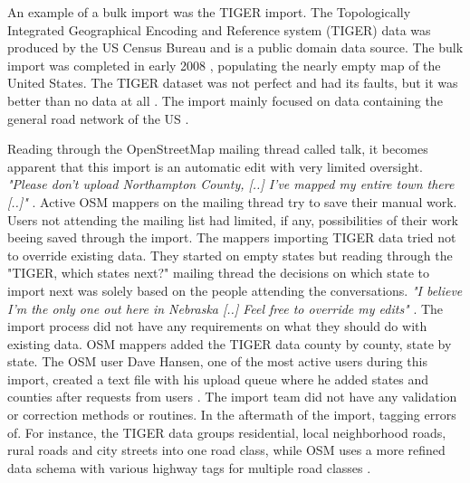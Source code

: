 An example of a bulk import was the TIGER import. The Topologically Integrated Geographical Encoding and Reference system (TIGER) data was produced by the US Census Bureau and is a public domain data source. The bulk import was completed in early 2008 \cite{Zielstra2013}, populating the nearly empty map of the United States. The TIGER dataset was not perfect and had its faults, but it was better than no data at all \cite{Willis2008}. The import mainly focused on data containing the general road network of the US \cite{Zielstra2013}. 

Reading through the OpenStreetMap mailing thread called talk, it becomes apparent that this import is an automatic edit with very limited oversight. \textit{"Please don't upload Northampton County, [..] I've mapped my entire town there [..]"} \cite{Mielczarek2007}.  Active OSM mappers on the mailing thread try to save their manual work. Users not attending the mailing list had limited, if any, possibilities of their work beeing saved through the import. The mappers importing TIGER data tried not to override existing data. They started on empty states but reading through the "TIGER, which states next?" mailing thread the decisions on which state to import next was solely based on the people attending the conversations. \textit{"I believe I'm the only one out here in Nebraska [..] Feel free to override my edits"} \cite{Bishop2007}. The import process did not have any requirements on what they should do with existing data. OSM mappers added the TIGER data county by county, state by state. The OSM user Dave Hansen, one of the most active users during this import, created a text file with his upload queue \cite{Hansen2007a} where he added states and counties after requests from users \cite{Hansen2007}\cite{Hansen2007b}. The import team did not have any validation or correction methods or routines. In the aftermath of the import, tagging errors of. For instance, the TIGER data groups residential, local neighborhood roads, rural roads and city streets into one road class, while OSM uses a more refined data schema with various highway tags for multiple road classes \cite{Zielstra2013}.

